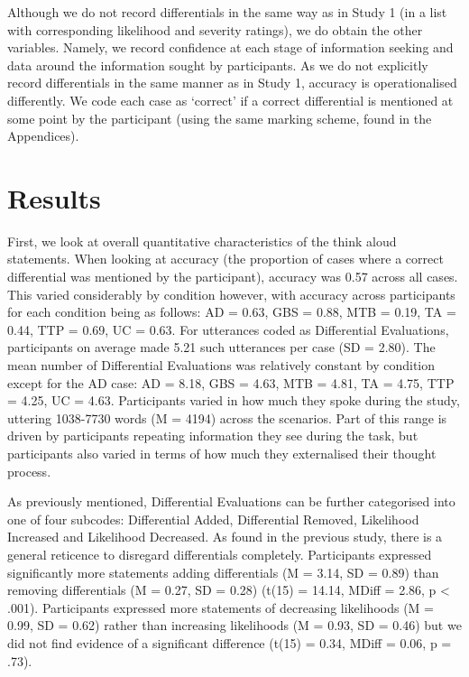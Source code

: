 \documentclass[a4paper, nobind]{templates/ociamthesis}
\begin{document}
Although we do not record differentials in the same way as in Study 1 (in a list with corresponding likelihood and severity ratings), we do obtain the other variables. Namely, we record confidence at each stage of information seeking and data around the information sought by participants. As we do not explicitly record differentials in the same manner as in Study 1, accuracy is operationalised differently. We code each case as `correct' if a correct differential is mentioned at some point by the participant (using the same marking scheme, found in the Appendices).

\hypertarget{results-1}{%
\section*{Results}\label{results-1}}

First, we look at overall quantitative characteristics of the think aloud statements. When looking at accuracy (the proportion of cases where a correct differential was mentioned by the participant), accuracy was 0.57 across all cases. This varied considerably by condition however, with accuracy across participants for each condition being as follows: AD = 0.63, GBS = 0.88, MTB = 0.19, TA = 0.44, TTP = 0.69, UC = 0.63. For utterances coded as Differential Evaluations, participants on average made 5.21 such utterances per case (SD = 2.80). The mean number of Differential Evaluations was relatively constant by condition except for the AD case: AD = 8.18, GBS = 4.63, MTB = 4.81, TA = 4.75, TTP = 4.25, UC = 4.63. Participants varied in how much they spoke during the study, uttering 1038-7730 words (M = 4194) across the scenarios. Part of this range is driven by participants repeating information they see during the task, but participants also varied in terms of how much they externalised their thought process.

As previously mentioned, Differential Evaluations can be further categorised into one of four subcodes: Differential Added, Differential Removed, Likelihood Increased and Likelihood Decreased. As found in the previous study, there is a general reticence to disregard differentials completely. Participants expressed significantly more statements adding differentials (M = 3.14, SD = 0.89) than removing differentials (M = 0.27, SD = 0.28) (t(15) = 14.14, MDiff = 2.86, p \textless{} .001). Participants expressed more statements of decreasing likelihoods (M = 0.99, SD = 0.62) rather than increasing likelihoods (M = 0.93, SD = 0.46) but we did not find evidence of a significant difference (t(15) = 0.34, MDiff = 0.06, p = .73).
\end{document}
